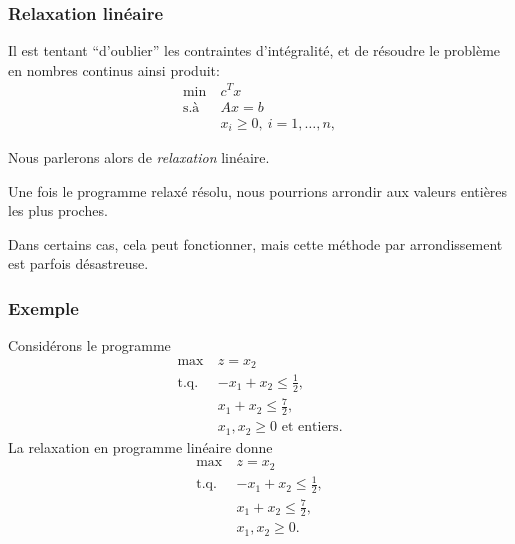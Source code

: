 \documentclass[usepdftitle=false]{beamer}
\def\st{\mbox{t.q. }}
\begin{document}
\begin{frame}
\frametitle{Relaxation linéaire}


Il est tentant ``d'oublier'' les contraintes d'intégralité, et de résoudre le problème en nombres continus ainsi produit:
\begin{equation}
	\begin{aligned}
	\min\ & c^Tx \\
	\mbox{s.à } & Ax = b \\
	& x_i \geq 0,\ i = 1,\ldots,n,
\end{aligned}
\tag{PL}
\label{eq:PL}
\end{equation}

Nous parlerons alors de {\sl relaxation} linéaire.

\mbox{}

Une fois le programme relaxé résolu, nous pourrions arrondir aux valeurs entières les plus proches.

\mbox{}

Dans certains cas, cela peut fonctionner, mais
cette méthode par arrondissement est parfois désastreuse.

\end{frame}

\begin{frame}
\frametitle{Exemple}

Considérons le programme
\begin{align*}
\max\ & z = x_2\\
\st & -x_1+x_2 \leq \frac{1}{2}, \\
& x_1 + x_2 \leq \frac{7}{2}, \\
& x_1, x_2 \geq 0 \mbox{ et entiers}.
\end{align*}
La relaxation en programme linéaire donne
\begin{align*}
\max\ & z = x_2\\
\st & -x_1+x_2 \leq \frac{1}{2}, \\
& x_1 + x_2 \leq \frac{7}{2}, \\
& x_1, x_2 \geq 0.
\end{align*}

\end{frame}
\end{document}
